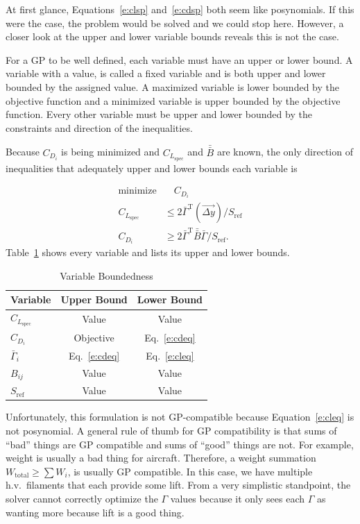 \documentclass[10pt, a4paper]{article}
\begin{document}
At first glance, Equations~\ref{e:clsp} and~\ref{e:cdsp} both seem like posynomials.  
If this were the case, the problem would be solved and we could stop here.  
However, a closer look at the upper and lower variable bounds reveals this is not the case. 

For a GP to be well defined, each variable must have an upper or lower bound.
A variable with a value, is called a fixed variable and is both upper and lower bounded by the assigned value.  
A maximized variable is lower bounded by the objective function and a minimized variable is upper bounded by the objective function. 
Every other variable must be upper and lower bounded by the constraints and direction of the inequalities.  

Because $C_{D_i}$ is being minimized and $C_{L_{\mathrm{spec}}}$ and $\bar{\bar{B}}$ are known, the only direction of inequalities that adequately upper and lower bounds each variable is

\begin{align}
    \text{minimize} & \quad C_{D_i} \nonumber \\
    \label{e:cleq}
    C_{L_{\mathrm{spec}}} &\leq 2 \bar{\Gamma}^{\mathrm{T}} (\vec{\Delta y})/S_{\mathrm{ref}} \\
    \label{e:cdeq}
    C_{D_i} &\geq 2 \bar{\Gamma}^{\mathrm{T}} \bar{\bar{B}} \bar{\Gamma}/S_{\mathrm{ref}}.
\end{align}
Table~\ref{t:bounds} shows every variable and lists its upper and lower bounds. 

\begin{longtable}{lcc}
\caption{Variable Boundedness}\\
\toprule
\toprule
\label{t:bounds}
Variable                    & Upper Bound       & Lower Bound      \\ \midrule
$C_{L_{\mathrm{spec}}}$     & Value             & Value            \\
$C_{D_i}$                   & Objective         & Eq.~\ref{e:cdeq} \\
$\bar{\Gamma}_i$            & Eq.~\ref{e:cdeq}  & Eq.~\ref{e:cleq} \\
$B_{ij}$                    & Value             & Value            \\
$S_{\mathrm{ref}}$          & Value             & Value            \\
\bottomrule
\end{longtable}

Unfortunately, this formulation is not GP-compatible because Equation~\ref{e:cleq} is not posynomial.  
A general rule of thumb for GP compatibility is that sums of ``bad'' things are GP compatible and sums of ``good'' things are not.  
For example, weight is usually a bad thing for aircraft.  Therefore, a weight summation $W_{\mathrm{total}} \geq \sum W_i$, is usually GP compatible. 
In this case, we have multiple h.v.\ filaments that each provide some lift.  
From a very simplistic standpoint, the solver cannot correctly optimize the $\Gamma$ values because it only sees each $\Gamma$ as wanting more because lift is a good thing. 
\end{document}
